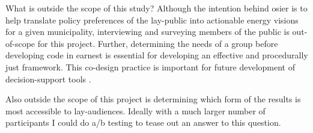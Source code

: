 What is outside the scope of this study? Although the intention behind
\ac{osier} is to help translate policy preferences of the lay-public into
actionable energy visions for a given municipality, interviewing and surveying
members of the public is out-of-scope for this project. Further, determining the
needs of a group before developing code in earnest is essential for developing
an effective and procedurally just framework. This co-design practice is
important for future development of decision-support tools
\cite{gonzalez_developing_2022,ryder_developing_2018}.

Also outside the scope of this project is determining which form of the results
is most accessible to lay-audiences. Ideally with a much larger number of
participants I could do a/b testing to tease out an answer to this question.
